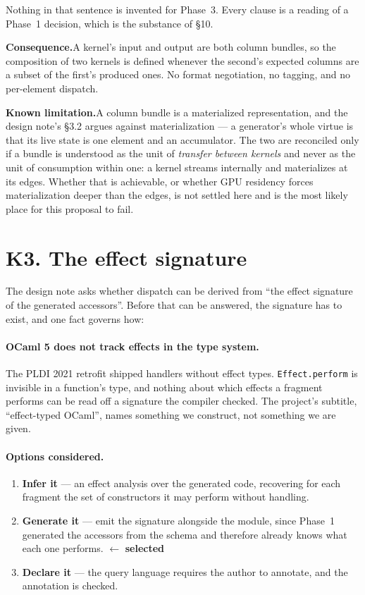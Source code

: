 \documentclass[11pt,a4paper]{article}
\newcommand{\selected}{\textcolor{decided}{$\leftarrow$ \textbf{selected}}}
\newcommand{\limitation}[1]{%
  \par\noindent\textbf{Known limitation.}\quad #1\par\medskip}
\newcommand{\options}{\paragraph{Options considered.}}
\newcommand{\consequence}[1]{%
  \par\noindent\textbf{Consequence.}\quad #1\par\medskip}
\begin{document}
Nothing in that sentence is invented for Phase~3. Every clause is a reading of
a Phase~1 decision, which is the substance of \S10.

\consequence{A kernel's input and output are both column bundles, so the
composition of two kernels is defined whenever the second's expected columns
are a subset of the first's produced ones. No format negotiation, no tagging,
and no per-element dispatch.}

\limitation{A column bundle is a materialized representation, and the design
note's §3.2 argues against materialization --- a generator's whole virtue is
that its live state is one element and an accumulator. The two are reconciled
only if a bundle is understood as the unit of \emph{transfer between kernels}
and never as the unit of consumption within one: a kernel streams internally
and materializes at its edges. Whether that is achievable, or whether GPU
residency forces materialization deeper than the edges, is not settled here
and is the most likely place for this proposal to fail.}

\section{K3. The effect signature}

The design note asks whether dispatch can be derived from ``the effect
signature of the generated accessors''. Before that can be answered, the
signature has to exist, and one fact governs how:

\paragraph{OCaml 5 does not track effects in the type system.} The PLDI 2021
retrofit shipped handlers without effect types. \texttt{Effect.perform} is
invisible in a function's type, and nothing about which effects a fragment
performs can be read off a signature the compiler checked. The project's
subtitle, ``effect-typed OCaml'', names something we construct, not something
we are given.

\options
\begin{enumerate}[label=\textbf{(\alph*)}]
  \item \textbf{Infer it} --- an effect analysis over the generated code,
        recovering for each fragment the set of constructors it may perform
        without handling.
  \item \textbf{Generate it} --- emit the signature alongside the module,
        since Phase~1 generated the accessors from the schema and therefore
        already knows what each one performs. \selected
  \item \textbf{Declare it} --- the query language requires the author to
        annotate, and the annotation is checked.
\end{enumerate}
\end{document}
